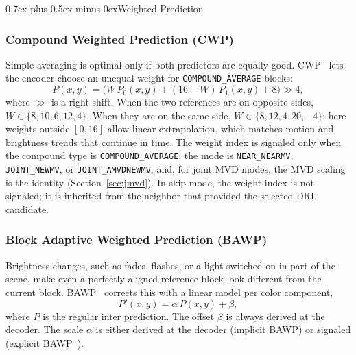 \documentclass[journal]{IEEEtran}
\makeatletter
\newcommand{\code}[1]{\texttt{#1}}
\def\subsection{\@startsection{subsection}{2}{\z@}{2.5ex plus 1ex minus 1ex}%
{0.7ex plus 0.5ex minus 0ex}{\normalfont\normalsize\itshape}}%
\makeatother
\begin{document}
\subsection{Weighted Prediction}
\label{sec:weighted}

\subsubsection{Compound Weighted Prediction (CWP)}
Simple averaging is optimal only if both predictors are equally good.
CWP~\cite{cwgD027} lets the encoder choose an unequal weight for \code{COMPOUND\_AVERAGE}
blocks:
\begin{equation}
  P(x,y) = \big(W\,P_0(x,y) + (16-W)\,P_1(x,y) + 8\big) \gg 4,
  \label{eq:cwp}
\end{equation}
where $\gg$ is a right shift. When the two references are on opposite sides,
$W\in\{8,10,6,12,4\}$. When they are on the same side,
$W\in\{8,12,4,20,-4\}$; here weights outside $[0,16]$ allow linear
extrapolation, which matches motion and brightness trends that continue in
time. The weight index is signaled only when the compound type is
\code{COMPOUND\_AVERAGE}, the mode is \code{NEAR\_NEARMV}, \code{JOINT\_NEWMV},
or \code{JOINT\_AMVDNEWMV}, and, for joint MVD modes, the MVD scaling is the
identity (Section~\ref{sec:jmvd}). In skip mode, the weight index is not
signaled; it is inherited from the neighbor that provided the selected DRL
candidate.

\subsubsection{Block Adaptive Weighted Prediction (BAWP)}
Brightness changes, such as fades, flashes, or a light switched on in part of
the scene, make even a perfectly aligned reference block look different from
the current block. BAWP~\cite{inter_bacp,cwgC069} corrects this with a linear model
per color component,
\begin{equation}
  P'(x,y) = \alpha\,P(x,y) + \beta ,
  \label{eq:bawp}
\end{equation}
where $P$ is the regular inter prediction. The offset $\beta$ is always
derived at the decoder. The scale $\alpha$ is either derived at the decoder
(implicit BAWP) or signaled (explicit BAWP~\cite{cwgD048}).
\end{document}
